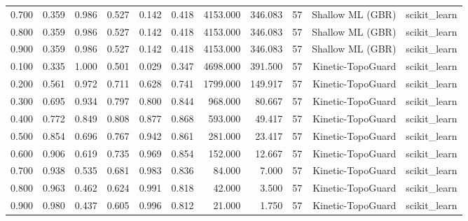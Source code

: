 \begin{tabular}{lrrrrrrrrrr}
0.700 & 0.359 & 0.986 & 0.527 & 0.142 & 0.418 & 4153.000 & 346.083 & 57 & Shallow ML (GBR) & scikit\_learn \\
0.800 & 0.359 & 0.986 & 0.527 & 0.142 & 0.418 & 4153.000 & 346.083 & 57 & Shallow ML (GBR) & scikit\_learn \\
0.900 & 0.359 & 0.986 & 0.527 & 0.142 & 0.418 & 4153.000 & 346.083 & 57 & Shallow ML (GBR) & scikit\_learn \\
0.100 & 0.335 & 1.000 & 0.501 & 0.029 & 0.347 & 4698.000 & 391.500 & 57 & Kinetic-TopoGuard & scikit\_learn \\
0.200 & 0.561 & 0.972 & 0.711 & 0.628 & 0.741 & 1799.000 & 149.917 & 57 & Kinetic-TopoGuard & scikit\_learn \\
0.300 & 0.695 & 0.934 & 0.797 & 0.800 & 0.844 & 968.000 & 80.667 & 57 & Kinetic-TopoGuard & scikit\_learn \\
0.400 & 0.772 & 0.849 & 0.808 & 0.877 & 0.868 & 593.000 & 49.417 & 57 & Kinetic-TopoGuard & scikit\_learn \\
0.500 & 0.854 & 0.696 & 0.767 & 0.942 & 0.861 & 281.000 & 23.417 & 57 & Kinetic-TopoGuard & scikit\_learn \\
0.600 & 0.906 & 0.619 & 0.735 & 0.969 & 0.854 & 152.000 & 12.667 & 57 & Kinetic-TopoGuard & scikit\_learn \\
0.700 & 0.938 & 0.535 & 0.681 & 0.983 & 0.836 & 84.000 & 7.000 & 57 & Kinetic-TopoGuard & scikit\_learn \\
0.800 & 0.963 & 0.462 & 0.624 & 0.991 & 0.818 & 42.000 & 3.500 & 57 & Kinetic-TopoGuard & scikit\_learn \\
0.900 & 0.980 & 0.437 & 0.605 & 0.996 & 0.812 & 21.000 & 1.750 & 57 & Kinetic-TopoGuard & scikit\_learn \\
\bottomrule
\end{tabular}